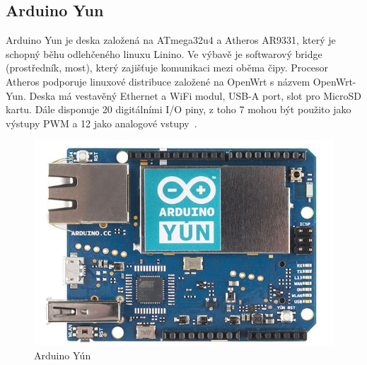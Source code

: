 	\subsection{Arduino Yun} 
	Arduino Yun je deska založená na ATmega32u4 a Atheros AR9331, který je schopný běhu odlehčeného linuxu Linino. Ve výbavě je softwarový bridge (prostředník, most), který zajišťuje komunikaci mezi oběma čipy. Procesor Atheros podporuje linuxové distribuce založené na OpenWrt s názvem OpenWrt-Yun. Deska má vestavěný Ethernet a WiFi modul, USB-A port, slot pro MicroSD kartu. Dále disponuje 20 digitálními I/O piny, z toho 7 mohou být použito jako výstupy PWM a 12 jako analogové vstupy~\cite{ArduinoYun}.	
	\begin{figure}[!h]
  \begin{center}
    \includegraphics[scale=0.3]{obrazky/emded_arduino_yun}
  \end{center}
  \caption{Arduino Yún~\cite{ArduinoYun}}
\end{figure}

	


